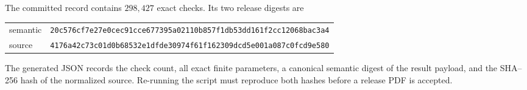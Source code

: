 The committed record contains \(298{,}427\) exact checks.  Its two
release digests are
\begin{center}
\small
\begin{tabular}{@{}ll@{}}
semantic & \nolinkurl{20c576cf7e27e0cec91cce677395a02110b857f1db53dd161f2cc12068bac3a4}\\
source & \nolinkurl{4176a42c73c01d0b68532e1dfde30974f61f162309dcd5e001a087c0fcd9e580}
\end{tabular}
\end{center}

The generated JSON records the check count, all exact finite parameters,
a canonical semantic digest of the result payload, and the SHA--256
hash of the normalized source.  Re-running the script must reproduce
both hashes before a release PDF is accepted.
